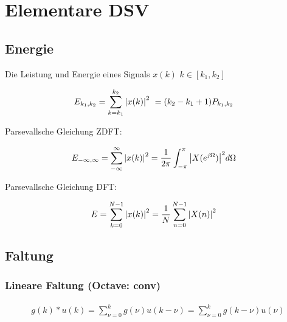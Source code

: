 \documentclass[10pt,a4paper]{article}
\begin{document}
\twocolumn
\pagestyle{fancy}
\section{Elementare DSV}
  \subsection{Energie}
  Die Leistung und Energie eines Signals $x(k)$ $k \in [k_1,k_2]$
  \begin{mdframed}[style=exercise]
    \begin{align}
        E_{k_1,k_2} &=\sum_{k=k_1}^{k_2} \abs{x(k)}^2 \ = (k_2 - k_1 +1) P_{k_1,k_2} 
    \end{align}
  \end{mdframed}
  Parsevallsche Gleichung ZDFT:
  \begin{mdframed}[style=exercise]
    \begin{align}
        E_{-\infty,\infty} &=\sum_{-\infty}^{\infty} \abs{x(k)}^2 = \frac{1}{2\pi}\displaystyle\int_{-\pi}^{\pi} \abs{X(e^{j\Omega})}^2 d\Omega
    \end{align}
  \end{mdframed}
  Parsevallsche Gleichung DFT:
  \begin{mdframed}[style=exercise]
    \begin{align}
        E &=\sum_{k=0}^{N-1} \abs{x(k)}^2 =\frac{1}{N}\sum_{n=0}^{N-1} \abs{X(n)}^2 
    \end{align}
  \end{mdframed}
  \subsection{Faltung}
  \subsubsection{Lineare Faltung (\textbf{Octave:} conv)}
  \begin{mdframed}[style=exercise]
    \begin{align}
        g(k)*u(k) = \sum_{\nu =0}^{k} g(\nu) u(k-\nu)= \sum_{\nu =0}^{k} g(k-\nu) u(\nu)
    \end{align}
  \end{mdframed}
\end{document}
